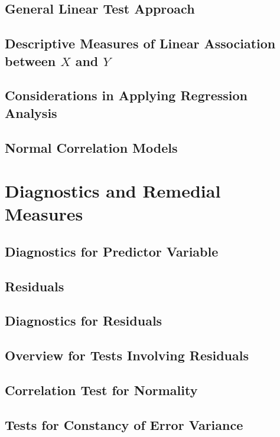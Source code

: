 \subsection{General Linear Test Approach}

\subsection{Descriptive Measures of Linear Association between $X$ and $Y$}

\subsection{Considerations in Applying Regression Analysis}

\subsection{Normal Correlation Models}


\section{Diagnostics and Remedial Measures}
\subsection{Diagnostics for Predictor Variable}

\subsection{Residuals}

\subsection{Diagnostics for Residuals}

\subsection{Overview for Tests Involving Residuals}

\subsection{Correlation Test for Normality}

\subsection{Tests for Constancy of Error Variance}

